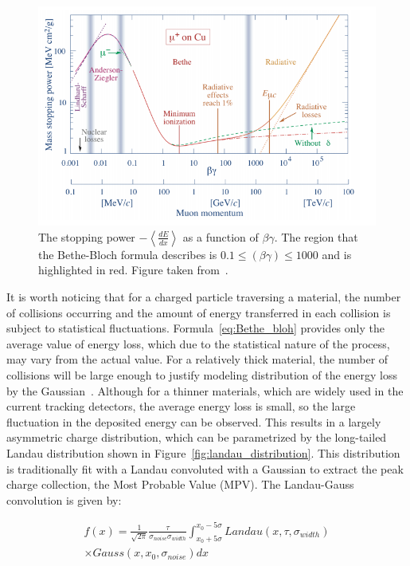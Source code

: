 \begin{figure}[h]
\centering
\includegraphics{figures/Bete_bloh.PNG}
\caption{ The stopping power $-\left< \frac{dE}{dx} \right>$ as a function of $\beta \gamma$. The region that the Bethe-Bloch formula describes is $0.1 \le (\beta \gamma) \le 1000$ and is highlighted in red. Figure taken from~\cite{PDG}.
\label{fig:Bethe_bloh}}
\end{figure}


It is worth noticing that for a charged particle traversing a material, the number of collisions occurring and the amount of energy transferred in each collision is subject to statistical fluctuations. Formula~\ref{eq:Bethe_bloh} provides only the average value of energy loss, which due to the statistical nature of the process, may vary from the actual value. 
For a relatively thick material, the number of collisions will be large enough to justify modeling distribution of the energy loss by the Gaussian~\cite{gauss_sensor}. Although for a thinner materials, which are widely used in the current tracking detectors, the average energy loss is small, so the large fluctuation in the deposited energy can be observed.    
 This results in a largely asymmetric charge distribution, which can be parametrized by the long-tailed Landau distribution shown in Figure~\ref{fig:landau_distribution}.  This distribution is traditionally fit with a Landau convoluted with a Gaussian to extract the peak charge collection, the Most Probable Value (MPV). The Landau-Gauss convolution is given by:

\begin{equation}
    \begin{split}
    f(x) = \frac{1}{\sqrt{2 \pi}} \frac{\tau}{\sigma_{noise} \sigma_{width}} \int_{x_0+5\sigma}^{x_0-5\sigma} Landau(x, \tau, \sigma_{width}) \\ \times Gauss (x, x_0,\sigma_{noise}) dx
    \end{split}
\end{equation}

